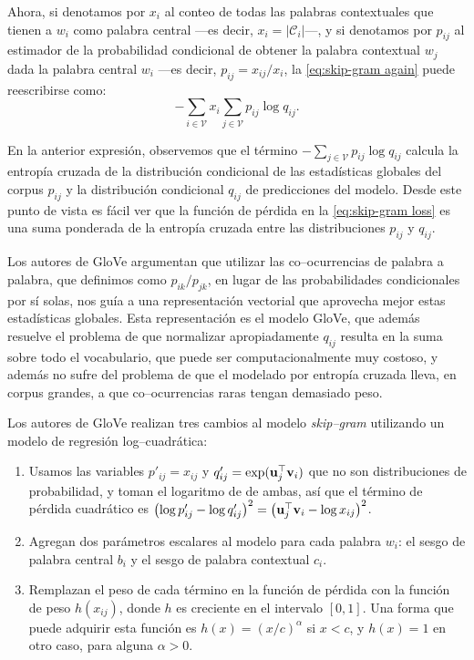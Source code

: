 \documentclass[12pt]{article}
\newcommand{\ce}{\bm{\textbf v}}
\newcommand{\co}{\bm{\textbf u}}
\begin{document}
Ahora, si denotamos por $ x_i $ al conteo de todas las palabras contextuales que tienen a $ w_i $ como palabra central ---es decir, $ x_i = |\mathcal{C}_i| $---, y si denotamos por $ p_{ij} $ al estimador de la probabilidad condicional de obtener la palabra contextual $ w_j $ dada la palabra central $ w_i $ ---es decir, $ p_{ij} =  x_{ij}/x_i $, la \cref{eq:skip-gram again} puede reescribirse como:
\begin{equation}
    -\sum_{i \in \mathcal{V}} x_{i}\sum_{j \in \mathcal{V}} p_{ij} \log q_{ij}.
\end{equation}

En la anterior expresión, observemos que el término $ -\sum_{j \in \mathcal{V}} p_{ij} \log q_{ij} $ calcula la entropía cruzada de la distribución condicional de las estadísticas globales del corpus $ p_{ij} $ y la distribución condicional $ q_{ij} $ de predicciones del modelo. Desde este punto de vista es fácil ver que la función de pérdida en la \cref{eq:skip-gram loss} es una suma ponderada de la entropía cruzada entre las distribuciones $ p_{ij} $ y $ q_{ij} $.

Los autores de GloVe argumentan que utilizar las co--ocurrencias de palabra a palabra, que definimos como $ p_{ik}/p_{jk} $, en lugar de las probabilidades condicionales por sí solas, nos guía a una representación vectorial que aprovecha mejor estas estadísticas globales. Esta representación es el modelo GloVe, que además resuelve el problema de que normalizar apropiadamente $ q_{ij} $ resulta en la suma sobre todo el vocabulario, que puede ser computacionalmente muy costoso, y además no sufre del problema de que el modelado por entropía cruzada lleva, en corpus grandes, a que co--ocurrencias raras tengan demasiado peso.

Los autores de GloVe realizan tres cambios al modelo \textit{skip--gram} utilizando un modelo de regresión log--cuadrática:
\begin{enumerate}
    \item Usamos las variables $ p'_{ij} = x_{ij} $ y $ q'_{ij} = \exp(\co_j^{\top}\ce_{i}) $ que no son distribuciones de probabilidad, y toman el logaritmo de de ambas, así que el término de pérdida cuadrático es $ \left( \log p'_{ij} - \log q'_{ij}\right)^2 = \left( \co_j^{\top}\ce_i - \log x_{ij} \right)^2 $.
    
    \item Agregan dos parámetros escalares al modelo para cada palabra $ w_i $: el sesgo de palabra central $ b_i $ y el sesgo de palabra contextual $ c_i $.
    
    \item Remplazan el peso de cada término en la función de pérdida con la función de peso $ h(x_{ij}) $, donde $ h $ es creciente en el intervalo $ [0,1] $. Una forma que puede adquirir esta función es $ h(x) = (x / c)^{\alpha} $ si $ x < c $, y $ h(x) = 1 $ en otro caso, para alguna $ \alpha > 0 $.
\end{enumerate}
\end{document}
